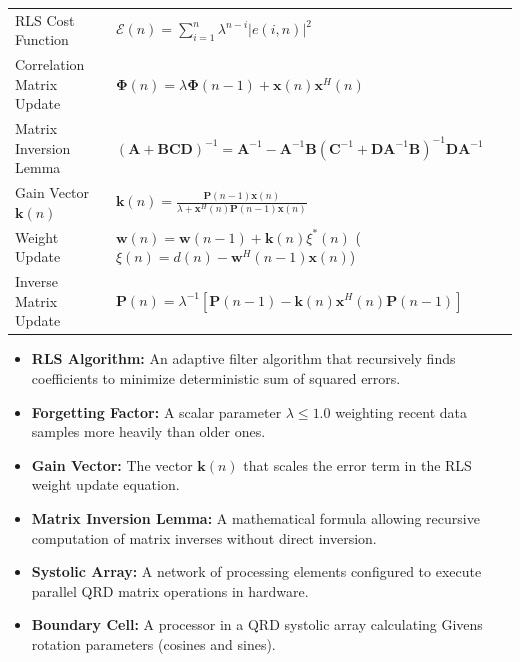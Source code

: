 \documentclass[12pt,a4paper]{article}
\renewcommand{\arraystretch}{1.45}
\begin{document}
\begin{tcolorbox}[formulabox, title={\textbf{Key Formulas at a Glance}}]
\renewcommand{\arraystretch}{1.3}
\begin{tabularx}{\linewidth}{B{4.5cm} X}RLS Cost Function & $\mathcal{E}(n) = \sum_{i=1}^n \lambda^{n-i} |e(i, n)|^2$ \\[6pt]
Correlation Matrix Update & $\mathbf{\Phi}(n) = \lambda \mathbf{\Phi}(n-1) + \mathbf{x}(n)\mathbf{x}^H(n)$ \\[6pt]
Matrix Inversion Lemma & $(\mathbf{A} + \mathbf{B}\mathbf{C}\mathbf{D})^{-1} = \mathbf{A}^{-1} - \mathbf{A}^{-1}\mathbf{B}(\mathbf{C}^{-1} + \mathbf{D}\mathbf{A}^{-1}\mathbf{B})^{-1}\mathbf{D}\mathbf{A}^{-1}$ \\[6pt]
Gain Vector $\mathbf{k}(n)$ & $\mathbf{k}(n) = \frac{\mathbf{P}(n-1)\mathbf{x}(n)}{\lambda + \mathbf{x}^H(n)\mathbf{P}(n-1)\mathbf{x}(n)}$ \\[6pt]
Weight Update & $\mathbf{w}(n) = \mathbf{w}(n-1) + \mathbf{k}(n)\xi^*(n)$ \quad ($\xi(n) = d(n) - \mathbf{w}^H(n-1)\mathbf{x}(n)$) \\[6pt]
Inverse Matrix Update & $\mathbf{P}(n) = \lambda^{-1} \left[ \mathbf{P}(n-1) - \mathbf{k}(n)\mathbf{x}^H(n)\mathbf{P}(n-1) \right]$
\end{tabularx}
\end{tcolorbox}

\begin{tcolorbox}[defbox, title={\textbf{One-Line Definitions}}]
\begin{itemize}[leftmargin=*, itemsep=2.5pt, topsep=0pt]
  \item \textbf{RLS Algorithm:} An adaptive filter algorithm that recursively finds coefficients to minimize deterministic sum of squared errors.
  \item \textbf{Forgetting Factor:} A scalar parameter $\lambda \le 1.0$ weighting recent data samples more heavily than older ones.
  \item \textbf{Gain Vector:} The vector $\mathbf{k}(n)$ that scales the error term in the RLS weight update equation.
  \item \textbf{Matrix Inversion Lemma:} A mathematical formula allowing recursive computation of matrix inverses without direct inversion.
  \item \textbf{Systolic Array:} A network of processing elements configured to execute parallel QRD matrix operations in hardware.
  \item \textbf{Boundary Cell:} A processor in a QRD systolic array calculating Givens rotation parameters (cosines and sines).
\end{itemize}
\end{tcolorbox}
\end{document}
